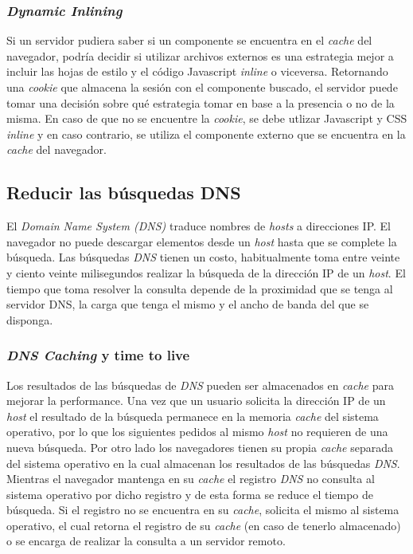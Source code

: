 \subsubsection{\emph{Dynamic Inlining}}

Si un servidor pudiera saber si un componente se encuentra en el \emph{cache} del navegador, podría decidir si utilizar archivos externos es una estrategia mejor
a incluir las hojas de estilo y el código Javascript \emph{inline} o viceversa.
Retornando una \emph{cookie} que almacena la sesión con el componente buscado, el servidor puede tomar
una decisión sobre qué estrategia tomar en base a la presencia o no de la
misma. En caso de que no se encuentre la \emph{cookie}, se debe utlizar Javascript y CSS \emph{inline} y
en caso contrario, se utiliza el componente externo que se encuentra en la \emph{cache} del navegador.

\subsection{Reducir las búsquedas DNS}

El \emph{Domain Name System (DNS)} traduce nombres de \emph{hosts} a direcciones IP. El navegador no puede descargar elementos desde un \emph{host}
hasta que se complete la búsqueda. Las búsquedas \emph{DNS} tienen un costo, habitualmente toma entre veinte y ciento veinte milisegundos realizar la búsqueda de la
dirección IP de un \emph{host}. El tiempo que toma resolver la consulta depende de la proximidad que se tenga al servidor DNS, la carga que tenga el mismo y el ancho de banda del que se disponga.

\subsubsection{\emph{DNS Caching} y {time to live}}

Los resultados de las búsquedas de \emph{DNS} pueden ser almacenados en \emph{cache} para mejorar la performance. Una vez que un usuario solicita la dirección IP de un \emph{host}
el resultado de la búsqueda permanece en la memoria \emph{cache} del sistema operativo, por lo que los siguientes pedidos al mismo \emph{host} no requieren de una nueva búsqueda.
Por otro lado los navegadores tienen su propia \emph{cache} separada del sistema operativo en la cual almacenan los resultados de las búsquedas \emph{DNS}.
Mientras el navegador mantenga en su \emph{cache} el registro \emph{DNS} no consulta al sistema operativo por dicho registro y de esta forma se reduce el tiempo de búsqueda.
Si el registro no se encuentra en su \emph{cache}, solicita el mismo al sistema operativo, el cual retorna el registro de su \emph{cache} (en caso de tenerlo almacenado) o
se encarga de realizar la consulta a un servidor remoto.

